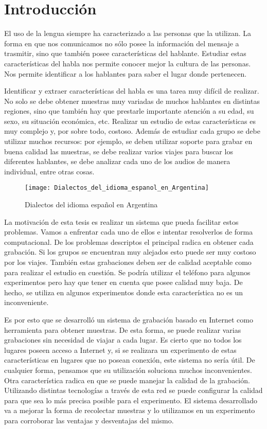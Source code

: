 
\chapter{Introducción}


El uso de la lengua siempre ha caracterizado a las personas que la utilizan. La forma en que nos comunicamos no sólo posee la información del mensaje a trasmitir, sino que también posee características del hablante. Estudiar estas características del habla nos permite conocer mejor la cultura de las personas. Nos permite identificar a los hablantes para saber el lugar donde pertenecen.

Identificar y extraer características del habla es una tarea muy difícil de realizar. No solo se debe obtener muestras muy variadas de muchos hablantes en distintas regiones, sino que también hay que prestarle importante atención a su edad, su sexo, su situación económica, etc. Realizar un estudio de estas características es muy complejo y, por sobre todo, costoso. Además de estudiar cada grupo se debe utilizar muchos recursos: por ejemplo, se deben utilizar soporte para grabar en buena calidad las muestras, se debe realizar varios viajes para buscar los diferentes hablantes, se debe analizar cada uno de los audios de manera individual, entre otras cosas. 

\begin{figure}[h!]
	\centering
    \texttt{[image: Dialectos\_del\_idioma\_espanol\_en\_Argentina]} 
    \caption{Dialectos del idioma español en Argentina}
    \label{fig11}
\end{figure}

La motivación de esta tesis es realizar un sistema que pueda facilitar estos problemas. Vamos a enfrentar cada uno de ellos e intentar resolverlos de forma computacional. De los problemas descriptos el principal radica en obtener cada grabación. Si los grupos se encuentran muy alejados esto puede ser muy costoso por los viajes. También estas grabaciones deben ser de calidad aceptable como para realizar el estudio en cuestión. Se podría utilizar el teléfono para algunos experimentos pero hay que tener en cuenta que posee calidad muy baja. De hecho, se utiliza en algunos experimentos donde esta característica no es un inconveniente. 

Es por esto que se desarrolló un sistema de grabación basado en Internet como herramienta para obtener muestras. De esta forma, se puede realizar varias grabaciones sin necesidad de viajar a cada lugar. Es cierto que no todos los lugares poseen acceso a Internet y, si se realizara un experimento de estas características en lugares que no posean conexión, este sistema no sería útil. De cualquier forma, pensamos que su utilización soluciona muchos inconvenientes. Otra característica radica en que se puede manejar la calidad de la grabación. Utilizando distintas tecnologías a través de esta red se puede configurar la calidad para que sea lo más precisa posible para el experimento. El sistema desarrollado va a mejorar la forma de recolectar muestras y lo utilizamos en un experimento para corroborar las ventajas y desventajas del mismo.

